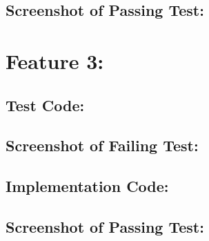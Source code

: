 \documentclass{article}
\begin{document}
\subsection*{Screenshot of Passing Test:}
\vspace*{5cm}

\newpage
\section*{Feature 3:}
\subsection*{Test Code:}
\vspace*{5cm}
\subsection*{Screenshot of Failing Test:}
\vspace*{5cm}
\subsection*{Implementation Code:}
\vspace*{5cm}
\subsection*{Screenshot of Passing Test:}
\vspace*{5cm}
\end{document}
